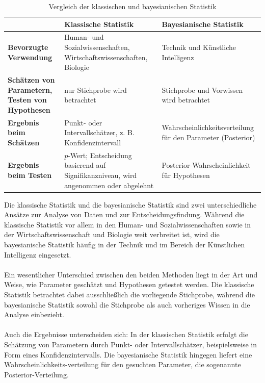 \documentclass[a4paper,12pt]{article}
\begin{document}
\begin{table}[h!]
  \centering
  \begin{tabular}{|p{3cm}|p{5cm}|p{6cm}|}
    \hline
    \textbf{} & \textbf{Klassische Statistik} & \textbf{Bayesianische Statistik} \\ \hline
    \textbf{Bevorzugte Verwendung} & Human- und Sozialwissenschaften, Wirtschaftswissenschaften, Biologie & Technik und Künstliche Intelligenz \\ 
    \hline
    \textbf{Schätzen von Parametern, Testen von Hypothesen} & nur Stichprobe wird betrachtet & Stichprobe und Vorwissen wird betrachtet \\
    \hline
    \textbf{Ergebnis beim Schätzen} & Punkt- oder Intervallschätzer, z. B. Konfidenzintervall & Wahrscheinlichkeitsverteilung für den Parameter (Posterior) 
    \\ \hline
  \textbf{Ergebnis beim Testen} & \(p\)-Wert; Entscheidung basierend auf Signifikanzniveau, wird angenommen oder abgelehnt & Posterior-Wahrscheinlichkeit für Hypothesen \\ 
  \hline
  \end{tabular}
  \caption{Vergleich der klassischen und bayesianischen Statistik}
  \label{tab:vergleich_verwendung}
\end{table}
\noindent
Die klassische Statistik und die bayesianische Statistik sind zwei unterschiedliche Ansätze zur Analyse
von Daten und zur Entscheidungsfindung. Während die klassische Statistik vor allem in den Human- und 
Sozialwissenschaften sowie in der Wirtschaftswissenschaft und Biologie weit verbreitet ist, wird die 
bayesianische Statistik häufig in der Technik und im Bereich der Künstlichen Intelligenz eingesetzt.\parencite[2]{StatistikKlassischOderBayes}\\\\
Ein wesentlicher Unterschied zwischen den beiden Methoden liegt in der Art und Weise, wie Parameter 
geschätzt und Hypothesen getestet werden. Die klassische Statistik betrachtet dabei ausschließlich 
die vorliegende Stichprobe, während die bayesianische Statistik sowohl die Stichprobe als 
auch vorheriges Wissen in die Analyse einbezieht. \\\\
Auch die Ergebnisse unterscheiden sich: In der klassischen Statistik erfolgt die Schätzung von 
Parametern durch Punkt- oder Intervallschätzer, beispielsweise in Form eines Konfidenzintervalls. 
Die bayesianische Statistik hingegen liefert eine Wahrscheinlichkeits-verteilung für den 
gesuchten Parameter, die sogenannte Posterior-Verteilung. \\\\
\end{document}
